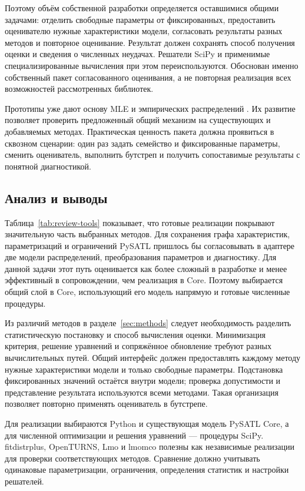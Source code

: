 Поэтому объём собственной разработки определяется оставшимися общими
задачами: отделить свободные параметры от фиксированных, предоставить
оценивателю нужные характеристики модели, согласовать результаты
разных методов и повторное оценивание. Результат должен сохранять
способ получения оценки и сведения о численных неудачах. Решатели SciPy и применимые
специализированные вычисления при этом переиспользуются.
Обоснован именно собственный пакет согласованного оценивания,
а не повторная реализация всех возможностей рассмотренных библиотек.

Прототипы уже дают основу MLE и эмпирических распределений
\cite{reviewPrototype}. Их развитие позволяет проверить предложенный
общий механизм на существующих и добавляемых методах. Практическая
ценность пакета должна проявиться в сквозном сценарии: один раз задать
семейство и фиксированные параметры, сменить оцениватель, выполнить
бутстреп и получить сопоставимые результаты с понятной диагностикой.

\subsection{Анализ и выводы}
Таблица~\ref{tab:review-tools} показывает, что готовые реализации покрывают
значительную часть выбранных методов. Для сохранения графа характеристик,
параметризаций и ограничений PySATL пришлось бы согласовывать в адаптере
две модели распределений, преобразования параметров и диагностику.
Для данной задачи этот путь оценивается как более сложный в разработке
и менее эффективный в сопровождении, чем реализация в Core.
Поэтому выбирается общий слой в Core, использующий его модель напрямую
и готовые численные процедуры.

Из различий методов в разделе~\ref{sec:methods} следует необходимость
разделить статистическую постановку и способ вычисления оценки.
Минимизация критерия, решение уравнений и сопряжённое обновление требуют
разных вычислительных путей. Общий интерфейс должен предоставлять
каждому методу нужные характеристики модели и только свободные параметры.
Подстановка фиксированных значений остаётся внутри модели; проверка
допустимости и представление результата используются всеми методами.
Такая организация позволяет повторно применять оцениватель в бутстрепе.

Для реализации выбираются Python и существующая модель PySATL Core,
а для численной оптимизации и решения уравнений --- процедуры SciPy.
fitdistrplus, OpenTURNS, Lmo и lmomco полезны как независимые реализации
для проверки соответствующих методов. Сравнение должно учитывать
одинаковые параметризации, ограничения, определения статистик и настройки
решателей.
\label{sec:relatedworks-end}
